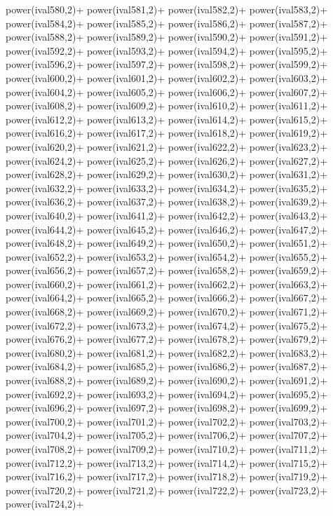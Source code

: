 \begin{DoxyCode}
{power(ival580,2)+
power(ival581,2)+
power(ival582,2)+
power(ival583,2)+
power(ival584,2)+
power(ival585,2)+
power(ival586,2)+
power(ival587,2)+
power(ival588,2)+
power(ival589,2)+
power(ival590,2)+
power(ival591,2)+
power(ival592,2)+
power(ival593,2)+
power(ival594,2)+
power(ival595,2)+
power(ival596,2)+
power(ival597,2)+
power(ival598,2)+
power(ival599,2)+
power(ival600,2)+
power(ival601,2)+
power(ival602,2)+
power(ival603,2)+
power(ival604,2)+
power(ival605,2)+
power(ival606,2)+
power(ival607,2)+
power(ival608,2)+
power(ival609,2)+
power(ival610,2)+
power(ival611,2)+
power(ival612,2)+
power(ival613,2)+
power(ival614,2)+
power(ival615,2)+
power(ival616,2)+
power(ival617,2)+
power(ival618,2)+
power(ival619,2)+
power(ival620,2)+
power(ival621,2)+
power(ival622,2)+
power(ival623,2)+
power(ival624,2)+
power(ival625,2)+
power(ival626,2)+
power(ival627,2)+
power(ival628,2)+
power(ival629,2)+
power(ival630,2)+
power(ival631,2)+
power(ival632,2)+
power(ival633,2)+
power(ival634,2)+
power(ival635,2)+
power(ival636,2)+
power(ival637,2)+
power(ival638,2)+
power(ival639,2)+
power(ival640,2)+
power(ival641,2)+
power(ival642,2)+
power(ival643,2)+
power(ival644,2)+
power(ival645,2)+
power(ival646,2)+
power(ival647,2)+
power(ival648,2)+
power(ival649,2)+
power(ival650,2)+
power(ival651,2)+
power(ival652,2)+
power(ival653,2)+
power(ival654,2)+
power(ival655,2)+
power(ival656,2)+
power(ival657,2)+
power(ival658,2)+
power(ival659,2)+
power(ival660,2)+
power(ival661,2)+
power(ival662,2)+
power(ival663,2)+
power(ival664,2)+
power(ival665,2)+
power(ival666,2)+
power(ival667,2)+
power(ival668,2)+
power(ival669,2)+
power(ival670,2)+
power(ival671,2)+
power(ival672,2)+
power(ival673,2)+
power(ival674,2)+
power(ival675,2)+
power(ival676,2)+
power(ival677,2)+
power(ival678,2)+
power(ival679,2)+
power(ival680,2)+
power(ival681,2)+
power(ival682,2)+
power(ival683,2)+
power(ival684,2)+
power(ival685,2)+
power(ival686,2)+
power(ival687,2)+
power(ival688,2)+
power(ival689,2)+
power(ival690,2)+
power(ival691,2)+
power(ival692,2)+
power(ival693,2)+
power(ival694,2)+
power(ival695,2)+
power(ival696,2)+
power(ival697,2)+
power(ival698,2)+
power(ival699,2)+
power(ival700,2)+
power(ival701,2)+
power(ival702,2)+
power(ival703,2)+
power(ival704,2)+
power(ival705,2)+
power(ival706,2)+
power(ival707,2)+
power(ival708,2)+
power(ival709,2)+
power(ival710,2)+
power(ival711,2)+
power(ival712,2)+
power(ival713,2)+
power(ival714,2)+
power(ival715,2)+
power(ival716,2)+
power(ival717,2)+
power(ival718,2)+
power(ival719,2)+
power(ival720,2)+
power(ival721,2)+
power(ival722,2)+
power(ival723,2)+
power(ival724,2)+
}
\end{DoxyCode}
